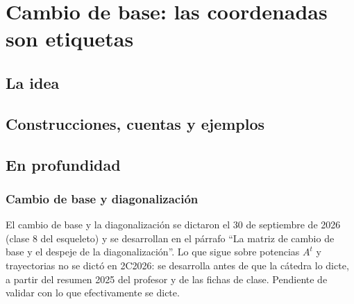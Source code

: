 \chapter{Cambio de base: las coordenadas son etiquetas}\label{cap:cambio-base}

\section{La idea}

\section{Construcciones, cuentas y ejemplos}

\section{En profundidad}

\subsection{Cambio de base y diagonalización}\label{sec:cambio-base}

{\small\vspace{1mm}\par}
{\small\vspace{1mm}\par}


\begin{atencion}[Anticipado]
El cambio de base y la diagonalización se dictaron el 30 de septiembre de 2026 (clase 8 del
esqueleto) y se desarrollan en el párrafo ``La matriz de cambio de base y el despeje de la
diagonalización''. Lo que sigue sobre potencias \(A^t\) y trayectorias no se dictó en 2C2026: se
desarrolla antes de que la cátedra lo dicte, a partir del resumen 2025 del profesor y de las
fichas de clase. Pendiente de validar con lo que efectivamente se dicte.
\end{atencion}

